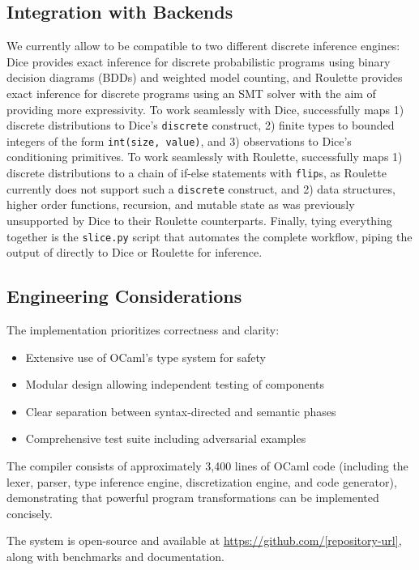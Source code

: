\subsection{Integration with Backends}
We currently allow \Slice{} to be compatible to two different discrete inference engines: Dice provides exact inference for discrete probabilistic programs using binary decision diagrams (BDDs) and weighted model counting, and Roulette provides exact inference for discrete programs using an SMT solver with the aim of providing more expressivity. To work seamlessly with Dice, \Slice{} successfully maps 1) discrete distributions to Dice's \texttt{discrete} construct, 2) finite types to bounded integers of the form \texttt{int(size, value)}, and 3) observations to Dice's conditioning primitives. To work seamlessly with Roulette, \Slice{} successfully maps 1) discrete distributions to a chain of if-else statements with \texttt{flip}s, as Roulette currently does not support such a \texttt{discrete} construct, and 2) data structures, higher order functions, recursion, and mutable state as was previously unsupported by Dice to their Roulette counterparts. Finally, tying everything together is the \texttt{slice.py} script that automates the complete workflow, piping the output of \Slice{} directly to Dice or Roulette for inference.



\subsection{Engineering Considerations}

The implementation prioritizes correctness and clarity:
\begin{itemize}
    \item Extensive use of OCaml's type system for safety
    \item Modular design allowing independent testing of components
    \item Clear separation between syntax-directed and semantic phases
    \item Comprehensive test suite including adversarial examples
\end{itemize}

The \Slice{} compiler consists of approximately 3,400 lines of OCaml code (including the lexer, parser, type inference engine, discretization engine, and code generator), demonstrating that powerful program transformations can be implemented concisely.

The system is open-source and available at \url{https://github.com/[repository-url]}, along with benchmarks and documentation.


